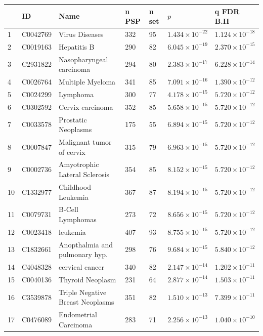 \begin{table}[ht]
\begin{adjustbox}{width=\textwidth}
\begin{tabular}{lllllll}
  \toprule
 & ID & Name & n PSP & n set & $p$ & q FDR B.H \\ 
  \midrule
1 & C0042769 & Virus Diseases & 332 & 95 & $1.434 \times 10^{-22}$ & $1.124 \times 10^{-18}$ \\ 
  2 & C0019163 & Hepatitis B & 290 & 82 & $6.045 \times 10^{-19}$ & $2.370 \times 10^{-15}$ \\ 
  3 & C2931822 & Nasopharyngeal carcinoma & 294 & 80 & $2.383 \times 10^{-17}$ & $6.228 \times 10^{-14}$ \\ 
  4 & C0026764 & Multiple Myeloma & 341 & 85 & $7.091 \times 10^{-16}$ & $1.390 \times 10^{-12}$ \\ 
  5 & C0024299 & Lymphoma & 300 & 77 & $4.178 \times 10^{-15}$ & $5.720 \times 10^{-12}$ \\ 
  6 & C0302592 & Cervix carcinoma & 352 & 85 & $5.658 \times 10^{-15}$ & $5.720 \times 10^{-12}$ \\ 
  7 & C0033578 & Prostatic Neoplasms & 175 & 55 & $6.894 \times 10^{-15}$ & $5.720 \times 10^{-12}$ \\ 
  8 & C0007847 & Malignant tumor of cervix & 315 & 79 & $6.963 \times 10^{-15}$ & $5.720 \times 10^{-12}$ \\ 
  9 & C0002736 & Amyotrophic Lateral Sclerosis & 354 & 85 & $8.152 \times 10^{-15}$ & $5.720 \times 10^{-12}$ \\ 
  10 & C1332977 & Childhood Leukemia & 367 & 87 & $8.194 \times 10^{-15}$ & $5.720 \times 10^{-12}$ \\ 
  11 & C0079731 & B-Cell Lymphomas & 273 & 72 & $8.656 \times 10^{-15}$ & $5.720 \times 10^{-12}$ \\ 
  12 & C0023418 & leukemia & 407 & 93 & $8.755 \times 10^{-15}$ & $5.720 \times 10^{-12}$ \\ 
  13 & C1832661 & Anopthalmia and pulmonary hyp. & 298 & 76 & $9.684 \times 10^{-15}$ & $5.840 \times 10^{-12}$ \\ 
  14 & C4048328 & cervical cancer & 340 & 82 & $2.147 \times 10^{-14}$ & $1.202 \times 10^{-11}$ \\ 
  15 & C0040136 & Thyroid Neoplasm & 231 & 64 & $2.877 \times 10^{-14}$ & $1.503 \times 10^{-11}$ \\ 
  16 & C3539878 & Triple Negative Breast Neoplasms & 351 & 82 & $1.510 \times 10^{-13}$ & $7.399 \times 10^{-11}$ \\ 
  17 & C0476089 & Endometrial Carcinoma & 283 & 71 & $2.256 \times 10^{-13}$ & $1.040 \times 10^{-10}$ \\ 

\end{tabular}
\end{adjustbox}
\end{table}
